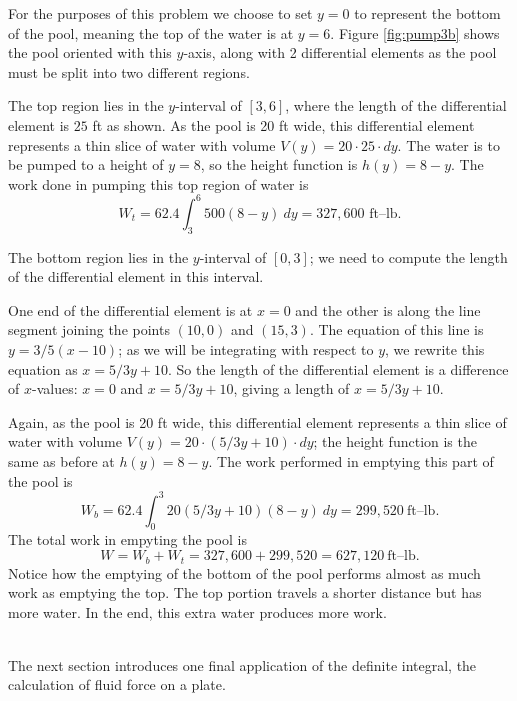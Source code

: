 {For the purposes of this problem we choose to set $y=0$ to represent the bottom of the pool, meaning the top of the water is at $y=6$. 
Figure \ref{fig:pump3b} shows the pool oriented with this $y$-axis, along with 2 differential elements as the pool must be split into two different regions. 

The top region lies in the $y$-interval of $[3,6]$, where the length of the differential element is $25$ ft as shown. As the pool is 20 ft wide, this differential element represents a thin slice of water with volume $V(y) = 20\cdot25\cdot dy$.  The water is to be pumped to a height of $y=8$, so the height function is $h(y) = 8-y$. The work done in pumping this top region of water is 
$$W_t = 62.4\int_3^6 500(8-y)\ dy = 327,600 \text{ ft--lb}.$$

The bottom region lies in the $y$-interval of $[0,3]$; we need to compute the length of the differential element in this interval.

One end of the differential element is at $x=0$ and the other is along the line segment joining the points $(10,0)$ and $(15,3)$. The equation of this line is $y= 3/5(x-10)$; as we will be integrating with respect to $y$, we rewrite this equation as $x=5/3y+10$. So the length of the differential element is a difference of $x$-values: $x=0$ and $x=5/3y+10$, giving a length of $x=5/3y+10$. 

Again, as the pool is 20 ft wide, this differential element  represents a thin slice of water with volume $V(y) = 20\cdot(5/3y+10)\cdot dy$; the height function is the same as before at $h(y)=8-y$. The work performed in emptying this part of the pool is
$$W_b = 62.4\int_0^3 20(5/3y+10)(8-y)\ dy = 299,520\ \text{ft--lb}.$$
The total work in empyting the pool is 
$$W = W_b+W_t = 327,600+299,520 = 627,120\ \text{ft--lb}.$$		
Notice how the emptying of the bottom of the pool performs almost as much work as emptying the top. The top portion travels a shorter distance but has more water. In the end, this extra water produces more work.
}\\

The next section introduces one final application of the definite integral, the calculation of fluid force on a plate.

